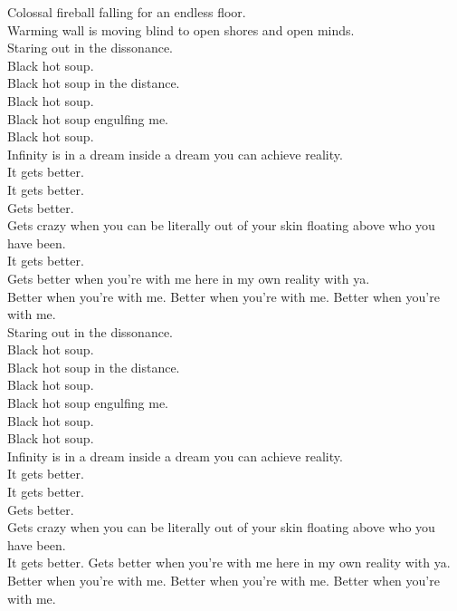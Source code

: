 Colossal fireball falling for an endless floor. \\
Warming wall is moving blind to open shores and open minds. \\

Staring out in the dissonance. \\
Black hot soup. \\
Black hot soup in the distance. \\
Black hot soup. \\
Black hot soup engulfing me. \\
Black hot soup. \\

Infinity is in a dream inside a dream you can achieve reality. \\
It gets better. \\
It gets better. \\
Gets better. \\
Gets crazy when you can be literally out of your skin floating above who you have been. \\
It gets better. \\
Gets better when you're with me here in my own reality with ya. \\
Better when you're with me. Better when you're with me. Better when you're with me. \\

Staring out in the dissonance. \\
Black hot soup. \\
Black hot soup in the distance. \\
Black hot soup. \\
Black hot soup engulfing me. \\
Black hot soup. \\

Black hot soup. \\

Infinity is in a dream inside a dream you can achieve reality. \\
It gets better. \\
It gets better. \\
Gets better. \\
Gets crazy when you can be literally out of your skin floating above who you have been. \\
It gets better. Gets better when you're with me here in my own reality with ya. \\
Better when you're with me. Better when you're with me. Better when you're with me. \\

